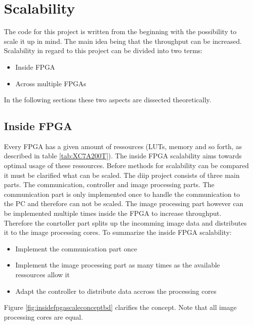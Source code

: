 %
%
\chapter{Scalability} \label{chapt:scalability}
The code for this project is written from the beginning with the possibility to
scale it up in mind. The main idea being that the throughput can be increased.
Scalability in regard to this project can be divided into two terms:
\begin{itemize}
    \item Inside FPGA
    \item Across multiple FPGAs
\end{itemize}

In the following sections these two aspects are dissected theoretically.

\section{Inside FPGA}
Every FPGA has a given amount of ressources (LUTs, memory and so forth, as
described in table \ref{tab:XC7A200T}). The inside FPGA scalability aims towards
optimal usage of these ressources. Before methods for scalability can be
compared it must be clarified what can be scaled. The \gls{diip} project
consists of three main parts. The communication, controller and image processing
parts. The communication part is only implemented once to handle the
communication to the PC and therefore can not be scaled. The image processing
part however can be implemented multiple times inside the FPGA to increase
throughput. Therefore the conrtoller part splits up the incomming image data and
distributes it to the image processing cores. To summarize the inside FPGA
scalability:
\begin{itemize}
    \item Implement the communication part once
    \item Implement the image processing part as many times as the available
    ressources allow it
    \item Adapt the controller to distribute data accross the processing cores
\end{itemize}

Figure \ref{fig:insidefpgascaleconceptbd} clarifies the concept. Note that all
image processing cores are equal.

